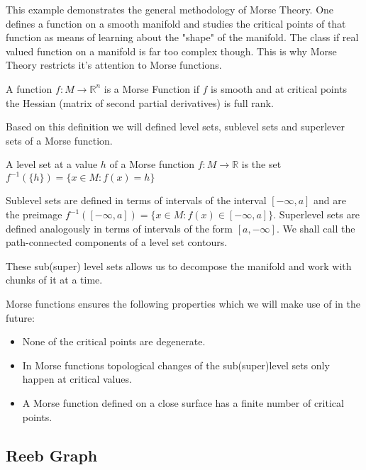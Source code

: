 This example demonstrates the general methodology of Morse Theory. One defines a function on a smooth manifold and studies the critical points of that function as means of learning about the "shape" of the manifold. The class if real valued function on a manifold is far too complex though. This is why Morse Theory restricts it's attention to Morse functions.


\begin{defn} A function $f: M \to \mathbb{R}^n$ is a Morse Function if $f$ is smooth and at critical points the Hessian (matrix of second partial derivatives) is full rank.   \end{defn}

Based on this definition we will defined level sets, sublevel sets and superlever sets of a Morse function.

\begin{defn} A level set at a value $h$ of a Morse function $f: M \to \mathbb{R}$ is the set $f^{-1}(\{h\}) = \{x \in M: f(x) = h \}$   \end{defn}

Sublevel sets are defined in terms of intervals of the interval $[-\infty, a]$ and are the preimage $f^{-1}([-\infty, a]) = \{x \in M: f(x) \in [-\infty, a] \}$. Superlevel sets are defined analogously in terms of intervals of the form $[a, -\infty]$. We shall call the path-connected components of a level set contours.

These sub(super) level sets allows us to decompose the manifold and work with chunks of it at a time.

Morse functions ensures the following properties which we will make use of in the future:

\begin{itemize}
    \item None of the critical points are degenerate.
    \item In Morse functions topological changes of the sub(super)level sets only happen at critical values. 
    \item A Morse function defined on a close surface has a finite number of critical points.
\end{itemize}

\subsection{Reeb Graph}




